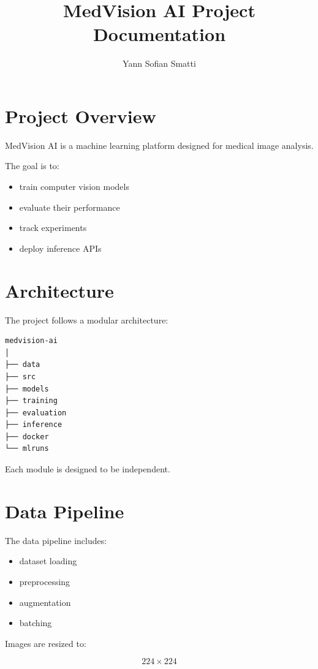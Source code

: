 ﻿\documentclass[11pt]{article}
\title{MedVision AI Project Documentation}
\author{Yann Sofian Smatti}
\date{}
\begin{document}
\maketitle

\tableofcontents

\newpage

\section{Project Overview}

MedVision AI is a machine learning platform designed for medical image analysis.

The goal is to:

\begin{itemize}
\item train computer vision models
\item evaluate their performance
\item track experiments
\item deploy inference APIs
\end{itemize}

\section{Architecture}

The project follows a modular architecture:

\begin{verbatim}
medvision-ai
│
├── data
├── src
├── models
├── training
├── evaluation
├── inference
├── docker
└── mlruns
\end{verbatim}

Each module is designed to be independent.

\section{Data Pipeline}

The data pipeline includes:

\begin{itemize}
\item dataset loading
\item preprocessing
\item augmentation
\item batching
\end{itemize}

Images are resized to:

\[
224 \times 224
\]
\end{document}
